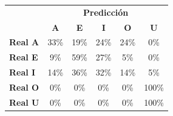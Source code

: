 \begin{tabular}{lccccc}
\toprule
 & \multicolumn{5}{c}{\textbf{Predicción}} \\
 & \textbf{A} & \textbf{E} & \textbf{I} & \textbf{O} & \textbf{U} \\
\midrule
\textbf{Real A} & \cellcolor[rgb]{0.77,0.77,1.00}  33\% & \cellcolor[rgb]{0.87,0.87,1.00}  19\% & \cellcolor[rgb]{0.83,0.83,1.00}  24\% & \cellcolor[rgb]{0.83,0.83,1.00}  24\% & \cellcolor[rgb]{1.00,1.00,1.00}  0\% \\
\textbf{Real E} & \cellcolor[rgb]{0.94,0.94,1.00}  9\% & \cellcolor[rgb]{0.59,0.59,1.00} \color{white} 59\% & \cellcolor[rgb]{0.81,0.81,1.00}  27\% & \cellcolor[rgb]{0.97,0.97,1.00}  5\% & \cellcolor[rgb]{1.00,1.00,1.00}  0\% \\
\textbf{Real I} & \cellcolor[rgb]{0.90,0.90,1.00}  14\% & \cellcolor[rgb]{0.75,0.75,1.00}  36\% & \cellcolor[rgb]{0.78,0.78,1.00}  32\% & \cellcolor[rgb]{0.90,0.90,1.00}  14\% & \cellcolor[rgb]{0.97,0.97,1.00}  5\% \\
\textbf{Real O} & \cellcolor[rgb]{1.00,1.00,1.00}  0\% & \cellcolor[rgb]{1.00,1.00,1.00}  0\% & \cellcolor[rgb]{1.00,1.00,1.00}  0\% & \cellcolor[rgb]{1.00,1.00,1.00}  0\% & \cellcolor[rgb]{0.30,0.30,1.00} \color{white} 100\% \\
\textbf{Real U} & \cellcolor[rgb]{1.00,1.00,1.00}  0\% & \cellcolor[rgb]{1.00,1.00,1.00}  0\% & \cellcolor[rgb]{1.00,1.00,1.00}  0\% & \cellcolor[rgb]{1.00,1.00,1.00}  0\% & \cellcolor[rgb]{0.30,0.30,1.00} \color{white} 100\% \\
\bottomrule
\end{tabular}